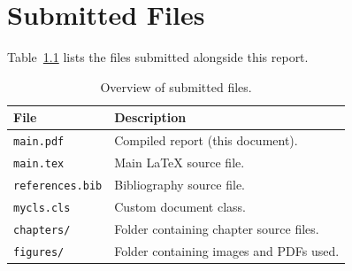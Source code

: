 
\chapter{Submitted Files}

Table~\ref{tab:submitted-files} lists the files submitted alongside this report.

\begin{table}[htbp]
	\centering
	\caption{Overview of submitted files.}
	\label{tab:submitted-files}
	\begin{tabular}{ll}
		\toprule
		\textbf{File} & \textbf{Description} \\
		\midrule
		\texttt{main.pdf}            & Compiled report (this document).        \\
		\texttt{main.tex}            & Main LaTeX source file.                 \\
		\texttt{references.bib}      & Bibliography source file.               \\
		\texttt{mycls.cls}           & Custom document class.                  \\
		\texttt{chapters/}           & Folder containing chapter source files. \\
		\texttt{figures/}            & Folder containing images and PDFs used. \\
		\bottomrule
	\end{tabular}
\end{table}

